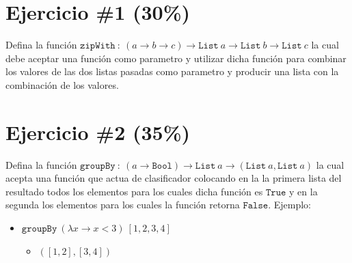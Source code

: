 \documentclass{article}
\begin{document}
\section*{Ejercicio \#1 (30\%)}
Defina la funci\'on $\mathtt{zipWith}\ :\ (a\rightarrow b\rightarrow c)\rightarrow \mathtt{List}\
a\rightarrow \mathtt{List}\ b\rightarrow \mathtt{List}\ c$ la cual debe aceptar una funci\'on
como parametro y utilizar dicha funci\'on para combinar los valores de las dos listas pasadas
como parametro y producir una lista con la combinaci\'on de los valores.

\section*{Ejercicio \#2 (35\%)}
Defina la funci\'on $\mathtt{groupBy}\ :\ (a\rightarrow \mathtt{Bool})\rightarrow \mathtt{List}\ a
\rightarrow(\mathtt{List}\ a,\mathtt{List}\ a)$ la cual acepta una funci\'on que actua de clasificador
colocando en la la primera lista del resultado todos los elementos para los cuales dicha funci\'on
es $\mathtt{True}$ y en la segunda los elementos para los cuales la funci\'on retorna $\mathtt{False}$.
Ejemplo:
\begin{itemize}
        \item{$\mathtt{groupBy}\ (\lambda x\rightarrow x < 3)\ [1,2,3,4]$
        \begin{itemize}
                \item{$([1,2],[3,4])$}
        \end{itemize}
        }
\end{itemize}
\end{document}
